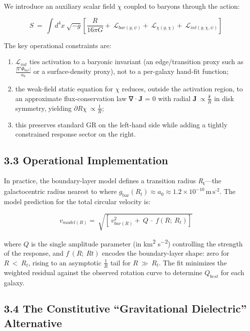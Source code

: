We introduce an auxiliary scalar field \(\chi\) coupled to baryons through the action:

\[S\  = \ \int d^{4}x\ \sqrt{- g}\left\lbrack \frac{R}{16\pi G} + \ \mathcal{L}_{bar(g,\psi)} + \ \mathcal{L}_{\chi(g,\chi)} + \ \mathcal{L}_{int(g,\chi,\psi)} \right\rbrack\]

The key operational constraints are:

\begin{enumerate}
\def\labelenumi{(\roman{enumi})}
\item
  \(\mathcal{L}_{int}\) ties activation to a baryonic invariant (an edge/transition proxy such as \(\frac{\left| \nabla\Phi_{bar} \right|}{a_{0}}\) or a surface-density proxy), not to a per-galaxy hand-fit function;
\item
  the weak-field static equation for \(\chi\) reduces, outside the activation region, to an approximate flux-conservation law ∇·\textbf{J} = 0 with radial \(\mathbf{J}\  \propto \frac{\widehat{\mathbf{r}}}{R}\) in disk symmetry, yielding \(\partial R\chi\  \propto \frac{1}{R}\);
\item
  this preserves standard GR on the left-hand side while adding a tightly constrained response sector on the right.
\end{enumerate}

\subsection{3.3 Operational Implementation}\label{operational-implementation}

In practice, the boundary-layer model defines a transition radius \emph{R}\textsubscript{t}---the galactocentric radius nearest to where \(g_{\text{bar}}\left( R_{t} \right) \approx a_{0} \approx 1.2 \times 10^{- 10}\,\text{m}\,\text{s}^{\text{-2}}\). The model prediction for the total circular velocity is:

\[v_{model(R)} = \ \sqrt{\left\lbrack \ v_{bar(R)}^{2} + \ Q\  \cdot \ f\left( R;\ R_{t} \right) \right\rbrack}\]

where \(Q\) is the single amplitude parameter (in km\textsuperscript{2} s\textsuperscript{−2}) controlling the strength of the response, and \(f\ (R;\ Rt)\) encodes the boundary-layer shape: zero for \(R\  < \ R_{t}\), rising to an asymptotic \(\frac{1}{R}\) tail for \(R\  \gg \ R_{t}\). The fit minimizes the weighted residual against the observed rotation curve to determine \(Q_{best}\) for each galaxy.

\subsection{3.4 The Constitutive ``Gravitational Dielectric'' Alternative}\label{the-constitutive-gravitational-dielectric-alternative}

